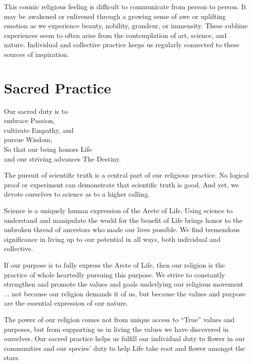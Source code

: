 \documentclass[ebook,12pt,openany,twoside]{memoir}
\newcommand{\tab}{\hspace*{2em}}
\newcommand{\imagefacingchapter}[1]{
  \cleartoverso
  \clearpage \null
  \thispagestyle{cleared}
  \AddToShipoutPictureBG*{%
    \AtStockLowerLeft{%
      \texttt{[image: \#1]}
    }
  }
  \clearpage
}
\begin{document}
This cosmic religious feeling is difficult to communicate from person to
person. It may be awakened or enlivened through a growing sense of awe or
uplifting emotion as we experience beauty, nobility, grandeur, or immensity.
These sublime experiences seem to often arise from the contemplation of art,
science, and nature. Individual and collective practice keeps us regularly
connected to these sources of inspiration.





\imagefacingchapter{images/SacredPractice}
\chapter{Sacred Practice}
\setlength\epigraphwidth{3.0in}
\epigraph{
  Our sacred duty is to\\
  embrace Passion,\\
  cultivate Empathy, and\\
  pursue Wisdom,\\
  \tab So that our being honors Life\\
  \tab and our striving advances The Destiny.
}{}

\noindent The pursuit of scientific truth is a central part of our religious
practice. No logical proof or experiment can demonstrate that scientific truth
is good. And yet, we devote ourselves to science as to a higher calling.

Science is a uniquely human expression of the Arete of Life. Using science to
understand and manipulate the world for the benefit of Life brings honor to the
unbroken thread of ancestors who made our lives possible. We find tremendous
significance in living up to our potential in all ways, both individual and
collective.

If our purpose is to fully express the Arete of Life, then our religion is the
practice of whole heartedly pursuing this purpose. We strive to constantly
strengthen and promote the values and goals underlying our religious movement
... not because our religion demands it of us, but because the values and
purpose are the essential expression of our nature.

The power of our religion comes not from unique access to ``True'' values and
purposes, but from supporting us in living the values we have discovered in
ourselves. Our sacred practice helps us fulfill our individual duty to
flower in our communities and our species' duty to help Life take root
and flower amongst the stars.
\end{document}
